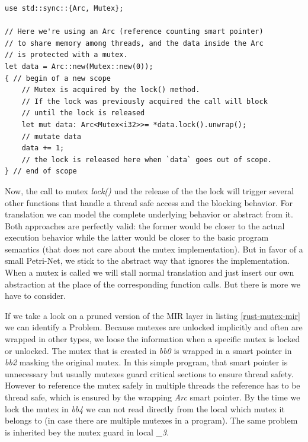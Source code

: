 \begin{lstlisting}
use std::sync::{Arc, Mutex};

// Here we're using an Arc (reference counting smart pointer)
// to share memory among threads, and the data inside the Arc
// is protected with a mutex.
let data = Arc::new(Mutex::new(0));
{ // begin of a new scope
    // Mutex is acquired by the lock() method.
    // If the lock was previously acquired the call will block
    // until the lock is released
    let mut data: Arc<Mutex<i32>>= *data.lock().unwrap();
    // mutate data
    data += 1;
    // the lock is released here when `data` goes out of scope.
} // end of scope
\end{lstlisting}

Now, the call to mutex \textit{lock()} und the release of the the lock will trigger several other functions that handle a thread safe access and the blocking behavior.
For translation we can model the complete underlying behavior or abstract from it.
Both approaches are perfectly valid: the former would be closer to the actual execution behavior while the latter would be closer to the basic program semantics (that does not care about the mutex implementation).
But in favor of a small Petri-Net, we stick to the abstract way that ignores the implementation.
When a mutex is called we will stall normal translation and just insert our own abstraction at the place of the corresponding function calls.
But there is more we have to consider.

If we take a look on a pruned version of the MIR layer in listing \ref{rust-mutex-mir} we can identify a Problem.
Because mutexes are unlocked implicitly and often are wrapped in other types, we loose the information when a specific mutex is locked or unlocked.
The mutex that is created in \textit{bb0} is wrapped in a smart pointer in \textit{bb2} masking the original mutex.
In this simple program, that smart pointer is unnecessary but usually mutexes guard critical sections to ensure thread safety.
However to reference the mutex safely in multiple threads the reference has to be thread safe, which is ensured by the wrapping \textit{Arc} smart pointer.
By the time we lock the mutex in \textit{bb4} we can not read directly from the local which mutex it belongs to (in case there are multiple mutexes in a program).
The same problem is inherited bey the mutex guard in local \textit{\_3}.

